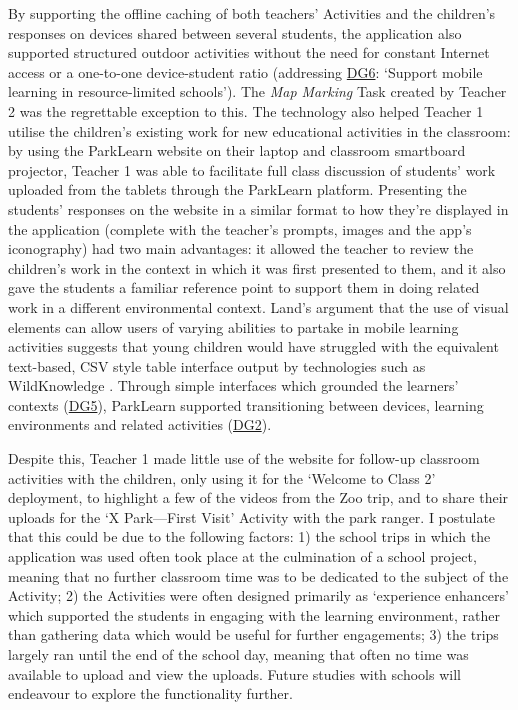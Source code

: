 By supporting the offline caching of both teachers’ Activities and the children’s responses on devices shared between several students, the application also supported structured outdoor activities without the need for constant Internet access or a one-to-one device-student ratio (addressing \hyperref[DG6]{DG6}: `Support mobile learning in resource-limited schools'). The \textit{Map Marking} Task created by Teacher 2 was the regrettable exception to this. The technology also helped Teacher 1 utilise the children’s existing work for new educational activities in the classroom: by using the ParkLearn website on their laptop and classroom smartboard projector, Teacher 1 was able to facilitate full class discussion of students’ work uploaded from the tablets through the ParkLearn platform. Presenting the students’ responses on the website in a similar format to how they’re displayed in the application (complete with the teacher’s prompts, images and the app’s iconography) had two main advantages: it allowed the teacher to review the children’s work in the context in which it was first presented to them, and it also gave the students a familiar reference point to support them in doing related work in a different environmental context. Land’s argument that the use of visual elements can allow users of varying abilities to partake in mobile learning activities \citep{Land2015} suggests that young children would have struggled with the equivalent text-based, CSV style table interface output by technologies such as WildKnowledge \citep{WildKnowledge2015}. Through simple interfaces which grounded the learners' contexts (\hyperref[DG5]{DG5}), ParkLearn supported transitioning between devices, learning environments and related activities (\hyperref[DG2]{DG2}). 

Despite this, Teacher 1 made little use of the website for follow-up classroom activities with the children, only using it for the `Welcome to Class 2' deployment, to highlight a few of the videos from the Zoo trip, and to share their uploads for the `X Park---First Visit' Activity with the park ranger. I postulate that this could be due to the following factors: 1) the school trips in which the application was used often took place at the culmination of a school project, meaning that no further classroom time was to be dedicated to the subject of the Activity; 2) the Activities were often designed primarily as `experience enhancers' which supported the students in engaging with the learning environment, rather than gathering data which would be useful for further engagements;  3) the trips largely ran until the end of the school day, meaning that often no time was available to upload and view the uploads. Future studies with schools will endeavour to explore the functionality further.

